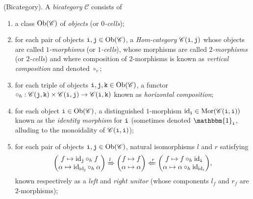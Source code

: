 \noindent\begin{definition}\textup{(Bicategory).} A {\em bicategory} $\mathscr{C}$ consists of
\begin{enumerate}[label=$\bullet$, leftmargin=4\parindent]
\item a class $\textup{Ob}(\mathscr{C})$ of {\em objects} (or {\em $0$-cells});
\item for each pair of objects $\textup{\texttt{i}}, \textup{\texttt{j}} \in \textup{Ob}(\mathscr{C})$, a {\em Hom-category} $\mathscr{C}(\textup{\texttt{i}}, \textup{\texttt{j}})$ whose objects are called {\em $1$-morphisms} (or {\em $1$-cells}), whose morphisms are called {\em $2$-morphisms} (or {\em $2$-cells}) and where composition of $2$-morphisms is known as {\em vertical composition} and denoted $\circ_v$;
\item for each triple of objects $\textup{\texttt{i}}, \textup{\texttt{j}}, \textup{\texttt{k}} \in \textup{Ob}(\mathscr{C})$, a functor $\circ_h : \mathscr{C}(\textup{\texttt{j}}, \textup{\texttt{k}}) \times \mathscr{C}(\textup{\texttt{i}}, \textup{\texttt{j}}) \to \mathscr{C}(\textup{\texttt{i}}, \textup{\texttt{k}})$ known as {\em horizontal composition};
\item for each object $\textup{\texttt{i}} \in \textup{Ob}(\mathscr{C})$, a distinguished $1$-morphism $\textup{id}_{\textup{\texttt{i}}} \in \textup{Mor}(\mathscr{C}(\textup{\texttt{i}}, \textup{\texttt{i}}))$ known as the {\em identity morphism} for $\textup{\texttt{i}}$ (sometimes denoted $\mathbbm{1}_\textobj{i}$, alluding to the monoidality of $\mathscr{C}(\textup{\texttt{i}}, \textup{\texttt{i}})$);
\item for each pair of objects $\textup{\texttt{i}}, \textup{\texttt{j}} \in \textup{Ob}(\mathscr{C})$, natural isomorphisms $l$ and $r$ satisfying
\begin{align*}
\begin{split}
\begin{pmatrix}f \mapsto \textup{id}_{\textup{\texttt{j}}} \circ_h f\\\alpha \mapsto \textup{id}_{\textup{id}_{\textup{\texttt{j}}}} \circ_h \alpha\end{pmatrix} \xRightarrow{l} \begin{pmatrix}f \mapsto f\\\alpha \mapsto \alpha\end{pmatrix} \xLeftarrow{r} \begin{pmatrix}f \mapsto f \circ_h \textup{id}_{\textup{\texttt{i}}}\\\alpha \mapsto \alpha \circ_h \textup{id}_{\textup{id}_{\textup{\texttt{i}}}}\end{pmatrix}\!,
\end{split}
\end{align*}
known respectively as a {\em left} and {\em right unitor} (whose components $l_f$ and $r_f$ are $2$-morphisms);

\end{enumerate}
\end{definition}
